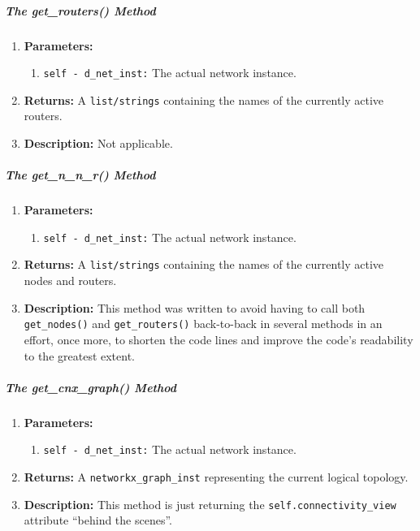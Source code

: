     \subparagraph{The get\_routers() Method}
        \begin{enumerate}
            \item \textbf{Parameters:}
            \begin{enumerate}
                \item \texttt{self - d\_net\_inst:} The actual network instance.
            \end{enumerate}
            \item \textbf{Returns:} A \texttt{list/strings} containing the names of the currently active routers.
            \item \textbf{Description:} Not applicable.
        \end{enumerate}

    \subparagraph{The get\_n\_n\_r() Method}
        \begin{enumerate}
            \item \textbf{Parameters:}
            \begin{enumerate}
                \item \texttt{self - d\_net\_inst:} The actual network instance.
            \end{enumerate}
            \item \textbf{Returns:} A \texttt{list/strings} containing the names of the currently active nodes and routers.
            \item \textbf{Description:} This method was written to avoid having to call both \texttt{get\_nodes()} and \texttt{get\_routers()} back-to-back in several methods in an effort, once more, to shorten the code lines and improve the code's readability to the greatest extent.
        \end{enumerate}

    \subparagraph{The get\_cnx\_graph() Method}
        \begin{enumerate}
            \item \textbf{Parameters:}
            \begin{enumerate}
                \item \texttt{self - d\_net\_inst:} The actual network instance.
            \end{enumerate}
            \item \textbf{Returns:} A \texttt{networkx\_graph\_inst} representing the current logical topology.
            \item \textbf{Description:} This method is just returning the \texttt{self.connectivity\_view} attribute ``behind the scenes''.
        \end{enumerate}

